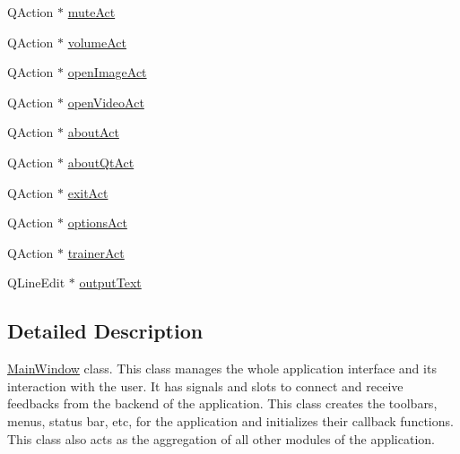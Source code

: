 \begin{DoxyCompactItemize}
\item 
QAction $\ast$ \hyperlink{classMainWindow_a4d55df68e5f3e8dd26107c16bab31269}{muteAct}
\item 
QAction $\ast$ \hyperlink{classMainWindow_a5f67932fedfa9f47e727c6bcaf9b6d4d}{volumeAct}
\item 
QAction $\ast$ \hyperlink{classMainWindow_af702728ef74d0f2d63d0149f9a92a576}{openImageAct}
\item 
QAction $\ast$ \hyperlink{classMainWindow_ad11682f531780b5ee71109c3f45fa822}{openVideoAct}
\item 
QAction $\ast$ \hyperlink{classMainWindow_a07b31cf99def3b2de7958ffaf2eec463}{aboutAct}
\item 
QAction $\ast$ \hyperlink{classMainWindow_ace057e46f03ed0988c768e7d185bae2b}{aboutQtAct}
\item 
QAction $\ast$ \hyperlink{classMainWindow_a9d8778fbb596e6a923c2844c2cedfc41}{exitAct}
\item 
QAction $\ast$ \hyperlink{classMainWindow_a6a4dce5f772be8e78902061458d7e556}{optionsAct}
\item 
QAction $\ast$ \hyperlink{classMainWindow_ae400629a8446466a559ad26c70ac335d}{trainerAct}
\item 
QLineEdit $\ast$ \hyperlink{classMainWindow_a504da7e825659f9a9b5db33c0be362d5}{outputText}
\end{DoxyCompactItemize}


\subsection{Detailed Description}
\hyperlink{classMainWindow}{MainWindow} class. This class manages the whole application interface and its interaction with the user. It has signals and slots to connect and receive feedbacks from the backend of the application. This class creates the toolbars, menus, status bar, etc, for the application and initializes their callback functions. This class also acts as the aggregation of all other modules of the application. 

